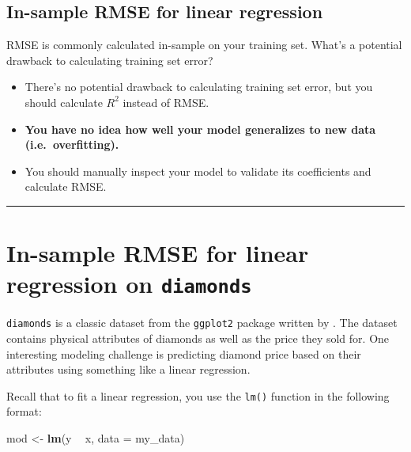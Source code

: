 \documentclass[
]{book}
\newenvironment{Shaded}{\begin{snugshade}}{\end{snugshade}}
\newcommand{\DataTypeTok}[1]{\textcolor[rgb]{0.13,0.29,0.53}{#1}}
\newcommand{\KeywordTok}[1]{\textcolor[rgb]{0.13,0.29,0.53}{\textbf{#1}}}
\newcommand{\NormalTok}[1]{#1}
\newcommand{\OperatorTok}[1]{\textcolor[rgb]{0.81,0.36,0.00}{\textbf{#1}}}
\newcommand{\StringTok}[1]{\textcolor[rgb]{0.31,0.60,0.02}{#1}}
\begin{document}
\hypertarget{in-sample-rmse-for-linear-regression}{%
\subsection*{In-sample RMSE for linear regression}\label{in-sample-rmse-for-linear-regression}}

RMSE is commonly calculated in-sample on your training set. What's a potential drawback to calculating training set error?

\begin{itemize}
\item
  There's no potential drawback to calculating training set error, but you should calculate \(R^2\) instead of RMSE.
\item
  \textbf{You have no idea how well your model generalizes to new data (i.e.~overfitting).}
\item
  You should manually inspect your model to validate its coefficients and calculate RMSE.
\end{itemize}

\begin{center}\rule{0.5\linewidth}{0.5pt}\end{center}

\hypertarget{in-sample-rmse-for-linear-regression-on-diamonds}{%
\section{\texorpdfstring{In-sample RMSE for linear regression on \texttt{diamonds}}{In-sample RMSE for linear regression on diamonds}}\label{in-sample-rmse-for-linear-regression-on-diamonds}}

\texttt{diamonds} is a classic dataset from the \texttt{ggplot2} package written by \citet{R-ggplot2}. The dataset contains physical attributes of diamonds as well as the price they sold for. One interesting modeling challenge is predicting diamond price based on their attributes using something like a linear regression.

Recall that to fit a linear regression, you use the \texttt{lm()} function in the following format:

\begin{Shaded}
\begin{Highlighting}[]
\NormalTok{mod <-}\StringTok{ }\KeywordTok{lm}\NormalTok{(y }\OperatorTok{~}\StringTok{ }\NormalTok{x, }\DataTypeTok{data =}\NormalTok{ my_data)}
\end{Highlighting}
\end{Shaded}
\end{document}
